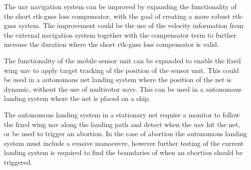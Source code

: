 The \gls{uav} navigation system can be improved by expanding the functionality of the short \gls{rtk-gnss} loss compensator, with the goal of creating a more robust \gls{rtk-gnss} system. The improvement could be the use of the velocity information from the external navigation system together with the compensator term to further increase the duration where the short \gls{rtk-gnss} loss compensator is valid.

The functionality of the mobile sensor unit can be expanded to enable the fixed wing \gls{uav} to apply target tracking of the position of the sensor unit. This could be used in a autonomous net landing system where the position of the net is dynamic, without the use of multirotor \glspl{uav}. This can be used in a autonomous landing system where the net is placed on a ship.

The autonomous landing system in a stationary net require a monitor to follow the fixed wing \gls{uav} along the landing path and detect when the \gls{uav} hit the net, or be used to trigger an abortion. In the case of abortion the autonomous landing system must include a evasive manoeuvre, however further testing of the current landing system is required to find the boundaries of when an abortion should be triggered.